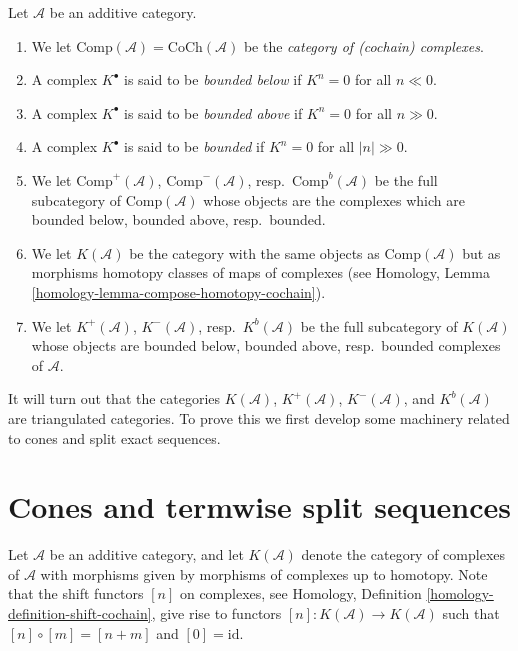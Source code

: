 \begin{definition}
\label{definition-complexes-notation}
Let $\mathcal{A}$ be an additive category.
\begin{enumerate}
\item We let $\text{Comp}(\mathcal{A}) = \text{CoCh}(\mathcal{A})$
be the {\it category of (cochain) complexes}.
\item A complex $K^\bullet$ is said to be
{\it bounded below} if $K^n = 0$ for all $n \ll 0$.
\item A complex $K^\bullet$ is said to be
{\it bounded above} if $K^n = 0$ for all $n \gg 0$.
\item A complex $K^\bullet$ is said to be
{\it bounded} if $K^n = 0$ for all $|n| \gg 0$.
\item We let
$\text{Comp}^{+}(\mathcal{A})$, $\text{Comp}^{-}(\mathcal{A})$,
resp.\ $\text{Comp}^b(\mathcal{A})$ be the full subcategory
of $\text{Comp}(\mathcal{A})$ whose objects are the complexes
which are bounded below, bounded above, resp.\ bounded.
\item We let $K(\mathcal{A})$ be the category with the same objects
as $\text{Comp}(\mathcal{A})$ but as morphisms homotopy classes of
maps of complexes (see
Homology, Lemma \ref{homology-lemma-compose-homotopy-cochain}).
\item We let $K^{+}(\mathcal{A})$, $K^{-}(\mathcal{A})$,
resp.\ $K^b(\mathcal{A})$ be the full subcategory of $K(\mathcal{A})$
whose objects are bounded below, bounded above, resp.\ bounded
complexes of $\mathcal{A}$.
\end{enumerate}
\end{definition}

\noindent
It will turn out that the categories $K(\mathcal{A})$,
$K^{+}(\mathcal{A})$, $K^{-}(\mathcal{A})$, and $K^b(\mathcal{A})$
are triangulated categories. To prove this we first develop
some machinery related to cones and split exact sequences.




\section{Cones and termwise split sequences}
\label{section-cones}

\noindent
Let $\mathcal{A}$ be an additive category, and let
$K(\mathcal{A})$ denote the category of complexes of
$\mathcal{A}$ with morphisms given by morphisms of
complexes up to homotopy. Note that the shift functors
$[n]$ on complexes, see
Homology, Definition \ref{homology-definition-shift-cochain},
give rise to functors $[n] : K(\mathcal{A}) \to K(\mathcal{A})$
such that $[n] \circ [m] = [n + m]$ and $[0] = \text{id}$.

